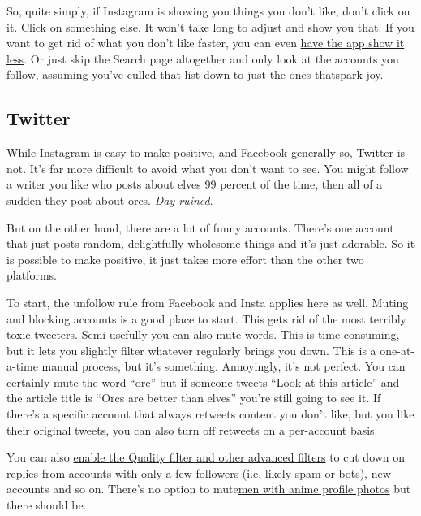 So, quite simply, if Instagram is showing you things you don't like,
don't click on it. Click on something else. It won't take long to adjust
and show you that. If you want to get rid of what you don't like faster,
you can even \href{https://help.instagram.com/1105548539497125}{have the
app show it less}. Or just skip the Search page altogether and only look
at the accounts you follow, assuming you've culled that list down to
just the ones
that\href{https://www.nytimes3xbfgragh.onion/2019/01/02/style/marie-kondo-netflix.html}{spark
joy}.

\hypertarget{twitter}{%
\subsection{Twitter}\label{twitter}}

While Instagram is easy to make positive, and Facebook generally so,
Twitter is not. It's far more difficult to avoid what you don't want to
see. You might follow a writer you like who posts about elves 99 percent
of the time, then all of a sudden they post about orcs. \emph{Day
ruined}.

But on the other hand, there are a lot of funny accounts. There's one
account that just posts \href{https://twitter.com/WholesomeMeme}{random,
delightfully wholesome things} and it's just adorable. So it is possible
to make positive, it just takes more effort than the other two
platforms.

To start, the unfollow rule from Facebook and Insta applies here as
well. Muting and blocking accounts is a good place to start. This gets
rid of the most terribly toxic tweeters. Semi-usefully you can also mute
words. This is time consuming, but it lets you slightly filter whatever
regularly brings you down. This is a one-at-a-time manual process, but
it's something. Annoyingly, it's not perfect. You can certainly mute the
word ``orc'' but if someone tweets ``Look at this article'' and the
article title is ``Orcs are better than elves'' you're still going to
see it. If there's a specific account that always retweets content you
don't like, but you like their original tweets, you can also
\href{https://help.twitter.com/en/using-twitter/retweet-faqs}{turn off
retweets on a per-account basis}.

You can also
\href{https://help.twitter.com/en/safety-and-security/control-your-twitter-experience}{enable
the Quality filter and other advanced filters} to cut down on replies
from accounts with only a few followers (i.e. likely spam or bots), new
accounts and so on. There's no option to
mute\href{https://knowyourmeme.com/memes/anime-profile-pictures}{men
with anime profile photos} but there should be.

